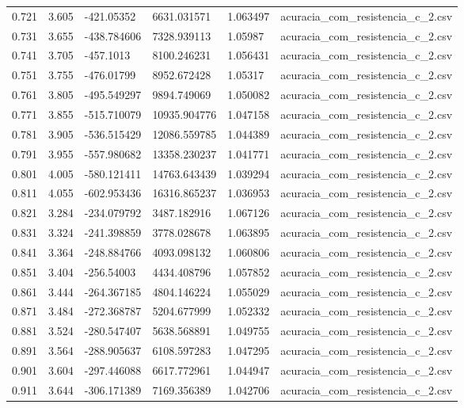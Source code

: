 \begin{table}
\begin{tabular}{llllll}
0.721 & 3.605 & -421.05352 & 6631.031571 & 1.063497 & acuracia\_com\_resistencia\_c\_2.csv \\
0.731 & 3.655 & -438.784606 & 7328.939113 & 1.05987 & acuracia\_com\_resistencia\_c\_2.csv \\
0.741 & 3.705 & -457.1013 & 8100.246231 & 1.056431 & acuracia\_com\_resistencia\_c\_2.csv \\
0.751 & 3.755 & -476.01799 & 8952.672428 & 1.05317 & acuracia\_com\_resistencia\_c\_2.csv \\
0.761 & 3.805 & -495.549297 & 9894.749069 & 1.050082 & acuracia\_com\_resistencia\_c\_2.csv \\
0.771 & 3.855 & -515.710079 & 10935.904776 & 1.047158 & acuracia\_com\_resistencia\_c\_2.csv \\
0.781 & 3.905 & -536.515429 & 12086.559785 & 1.044389 & acuracia\_com\_resistencia\_c\_2.csv \\
0.791 & 3.955 & -557.980682 & 13358.230237 & 1.041771 & acuracia\_com\_resistencia\_c\_2.csv \\
0.801 & 4.005 & -580.121411 & 14763.643439 & 1.039294 & acuracia\_com\_resistencia\_c\_2.csv \\
0.811 & 4.055 & -602.953436 & 16316.865237 & 1.036953 & acuracia\_com\_resistencia\_c\_2.csv \\
0.821 & 3.284 & -234.079792 & 3487.182916 & 1.067126 & acuracia\_com\_resistencia\_c\_2.csv \\
0.831 & 3.324 & -241.398859 & 3778.028678 & 1.063895 & acuracia\_com\_resistencia\_c\_2.csv \\
0.841 & 3.364 & -248.884766 & 4093.098132 & 1.060806 & acuracia\_com\_resistencia\_c\_2.csv \\
0.851 & 3.404 & -256.54003 & 4434.408796 & 1.057852 & acuracia\_com\_resistencia\_c\_2.csv \\
0.861 & 3.444 & -264.367185 & 4804.146224 & 1.055029 & acuracia\_com\_resistencia\_c\_2.csv \\
0.871 & 3.484 & -272.368787 & 5204.677999 & 1.052332 & acuracia\_com\_resistencia\_c\_2.csv \\
0.881 & 3.524 & -280.547407 & 5638.568891 & 1.049755 & acuracia\_com\_resistencia\_c\_2.csv \\
0.891 & 3.564 & -288.905637 & 6108.597283 & 1.047295 & acuracia\_com\_resistencia\_c\_2.csv \\
0.901 & 3.604 & -297.446088 & 6617.772961 & 1.044947 & acuracia\_com\_resistencia\_c\_2.csv \\
0.911 & 3.644 & -306.171389 & 7169.356389 & 1.042706 & acuracia\_com\_resistencia\_c\_2.csv \\

\end{tabular}
\end{table}
